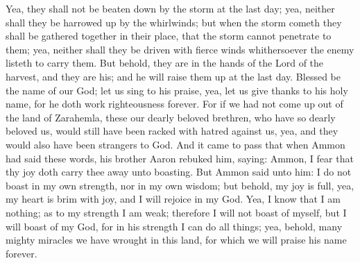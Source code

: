 Yea, they shall not be beaten down by the storm at the last day; yea, neither shall they be harrowed up by the whirlwinds; but when the storm cometh they shall be gathered together in their place, that the storm cannot penetrate to them; yea, neither shall they be driven with fierce winds whithersoever the enemy listeth to carry them.
\bverse \iffalse But behold, they are in the hands of the Lord of the harvest, and they are his; and he will raise them up at the last day. \fi
But behold, they are in the hands of the Lord of the harvest, and they are his; and he will raise them up at the last day.
\bverse \iffalse Blessed be the name of our God; let us sing to his praise, yea, let us give thanks to his holy name, for he doth work righteousness forever. \fi
Blessed be the name of our God; let us sing to his praise, yea, let us give thanks to his holy name, for he doth work righteousness forever.
\bverse \iffalse For if we had not come up out of the land of Zarahemla, these our dearly beloved brethren, who have so dearly beloved us, would still have been racked with hatred against us, yea, and they would also have been strangers to God. \fi
For if we had not come up out of the land of Zarahemla, these our dearly beloved brethren, who have so dearly beloved us, would still have been racked with hatred against us, yea, and they would also have been strangers to God.
\bverse \iffalse And it came to pass that when Ammon had said these words, his brother Aaron rebuked him, saying: Ammon, I fear that thy joy doth carry thee away unto boasting. \fi
And it came to pass that when Ammon had said these words, his brother Aaron rebuked him, saying: Ammon, I fear that thy joy doth carry thee away unto boasting.
\bverse \iffalse But Ammon said unto him: I do not boast in my own strength, nor in my own wisdom; but behold, my joy is full, yea, my heart is brim with joy, and I will rejoice in my God. \fi
But Ammon said unto him: I do not boast in my own strength, nor in my own wisdom; but behold, my joy is full, yea, my heart is brim with joy, and I will rejoice in my God.
\bverse \iffalse Yea, I know that I am nothing; as to my strength I am weak; therefore I will not boast of myself, but I will boast of my God, for in his strength I can do all things; yea, behold, many mighty miracles we have wrought in this land, for which we will praise his name forever. \fi
Yea, I know that I am nothing; as to my strength I am weak; therefore I will not boast of myself, but I will boast of my God, for in his strength I can do all things; yea, behold, many mighty miracles we have wrought in this land, for which we will praise his name forever.
